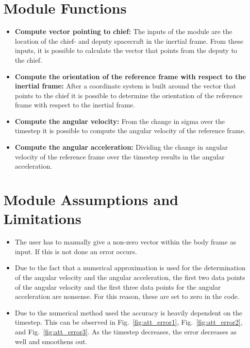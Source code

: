 

\section{Module Functions}

\begin{itemize}
    \item \textbf{Compute vector pointing to chief:} The inputs of the module are the location of the chief- and deputy spacecraft in the inertial frame. From these inputs, it is possible to calculate the vector that points from the deputy to the chief.
    \item \textbf{Compute the orientation of the reference frame with respect to the inertial frame:} After a coordinate system is built around the vector that points to the chief it is possible to determine the orientation of the reference frame with respect to the inertial frame.
    \item \textbf{Compute the angular velocity:} From the change in sigma over the timestep it is possible to compute the angular velocity of the reference frame.
    \item \textbf{Compute the angular acceleration:} Dividing the change in angular velocity of the reference frame over the timestep results in the angular acceleration.
\end{itemize}

\section{Module Assumptions and Limitations}

\begin{itemize}
    \item The user has to manually give a non-zero vector within the body frame as input. If this is not done an error occurs.
    \item Due to the fact that a numerical approximation is used for the determination of the angular velocity and the angular acceleration, the first two data points of the angular velocity and the first three data points for the angular acceleration are nonsense. For this reason, these are set to zero in the code.
    \item Due to the numerical method used the accuracy is heavily dependent on the timestep. This can be observed in Fig.~\ref{fig:att_error1}, Fig.~\ref{fig:att_error2}, and Fig.~\ref{fig:att_error3}. As the timestep decreases, the error decreases as well and smoothens out.
\end{itemize}

